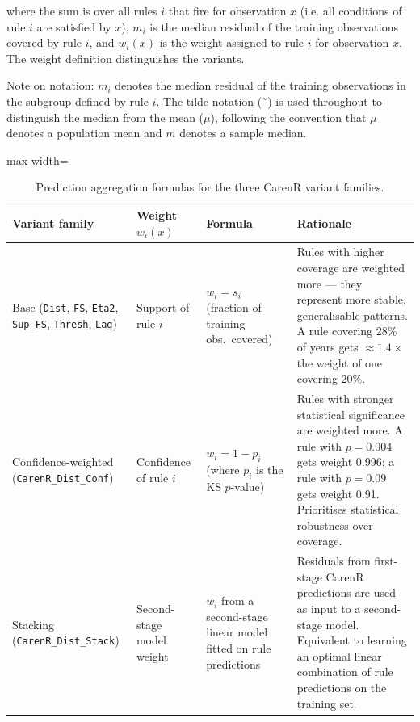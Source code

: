 where the sum is over all rules $i$ that fire for observation $x$ (i.e. all conditions of rule $i$ are satisfied by $x$), $m_i$ is the median residual of the training observations covered by rule $i$, and $w_i(x)$ is the weight assigned to rule $i$ for observation $x$. The weight definition distinguishes the variants.

Note on notation: $m_i$ denotes the median residual of the training observations in the subgroup defined by rule $i$. The tilde notation (˜) is used throughout to distinguish the median from the mean ($\mu$), following the convention that $\mu$ denotes a population mean and $m$ denotes a sample median.

\begin{table}[htbp]
  \centering
  \caption{Prediction aggregation formulas for the three CarenR variant families.}\label{tab:ch3b_1}
  \small
  \begin{adjustbox}{max width=\textwidth}
    \begin{tabularx}{\textwidth}{p{3.5cm} p{2.2cm} p{2.8cm} X}
    \toprule
    \textbf{Variant family} & \textbf{Weight $w_i(x)$} & \textbf{Formula} & \textbf{Rationale} \\
    \midrule
    Base (\texttt{Dist}, \texttt{FS}, \texttt{Eta2}, \texttt{Sup\_FS}, \texttt{Thresh}, \texttt{Lag})
      & Support of rule $i$
      & $w_i = s_i$ (fraction of training obs.\ covered)
      & Rules with higher coverage are weighted more — they represent more stable, generalisable patterns. A rule covering 28\% of years gets ${\approx}1.4\times$ the weight of one covering 20\%. \\[6pt]
    Confidence-weighted (\texttt{CarenR\_Dist\_Conf})
      & Confidence of rule $i$
      & $w_i = 1 - p_i$ (where $p_i$ is the KS $p$-value)
      & Rules with stronger statistical significance are weighted more. A rule with $p=0.004$ gets weight 0.996; a rule with $p=0.09$ gets weight 0.91. Prioritises statistical robustness over coverage. \\[6pt]
    Stacking (\texttt{CarenR\_Dist\_Stack})
      & Second-stage model weight
      & $w_i$ from a second-stage linear model fitted on rule predictions
      & Residuals from first-stage CarenR predictions are used as input to a second-stage model. Equivalent to learning an optimal linear combination of rule predictions on the training set. \\
    \bottomrule
  \end{tabularx}
  \end{adjustbox}

\end{table}


